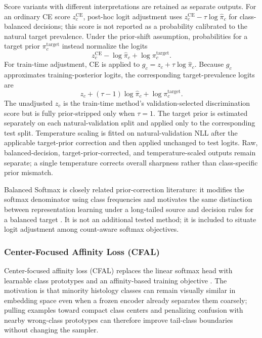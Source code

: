 \documentclass[11pt]{article}
\begin{document}
Score variants with different interpretations are retained as separate outputs. For an ordinary CE score $z_c^{\mathrm{CE}}$, post-hoc logit adjustment uses $z_c^{\mathrm{CE}}-\tau\log\widehat\pi_c$ for class-balanced decisions; this score is not reported as a probability calibrated to the natural target prevalence. Under the prior-shift assumption, probabilities for a target prior $\pi_c^{\mathrm{target}}$ instead normalize the logits
\begin{equation}
  z_c^{\mathrm{CE}}-\log\widehat\pi_c+\log\pi_c^{\mathrm{target}}.
  \label{eq:posthoc-target-prior}
\end{equation}
\noindent For train-time adjustment, CE is applied to $g_c=z_c+\tau\log\widehat\pi_c$. Because $g_c$ approximates training-posterior logits, the corresponding target-prevalence logits are
\begin{equation}
  z_c+(\tau-1)\log\widehat\pi_c+\log\pi_c^{\mathrm{target}}.
  \label{eq:train-time-target-prior}
\end{equation}
\noindent The unadjusted $z_c$ is the train-time method's validation-selected discrimination score but is fully prior-stripped only when $\tau=1$. The target prior is estimated separately on each natural-validation split and applied only to the corresponding test split. Temperature scaling is fitted on natural-validation NLL after the applicable target-prior correction and then applied unchanged to test logits. Raw, balanced-decision, target-prior-corrected, and temperature-scaled outputs remain separate; a single temperature corrects overall sharpness rather than class-specific prior mismatch.

Balanced Softmax is closely related prior-correction literature: it modifies the softmax denominator using class frequencies and motivates the same distinction between representation learning under a long-tailed source and decision rules for a balanced target \citep{ren2020balancedMeta}. It is not an additional tested method; it is included to situate logit adjustment among count-aware softmax objectives.

\subsubsection{Center-Focused Affinity Loss (CFAL)}
Center-focused affinity loss (CFAL) replaces the linear softmax head with learnable class prototypes and an affinity-based training objective \citep{mahbub2024centerFocused}. The motivation is that minority histology classes can remain visually similar in embedding space even when a frozen encoder already separates them coarsely; pulling examples toward compact class centers and penalizing confusion with nearby wrong-class prototypes can therefore improve tail-class boundaries without changing the sampler.
\end{document}
